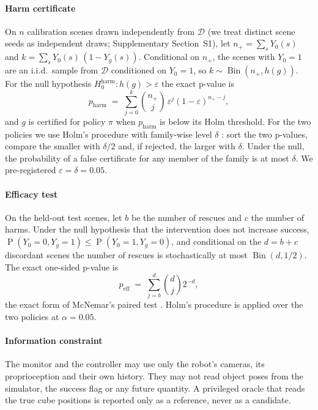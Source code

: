 \documentclass[preprint,12pt]{elsarticle}
\renewcommand{\Pr}{\operatorname{P}}
\newcommand{\Bin}{\operatorname{Bin}}
\begin{document}
\paragraph{Harm certificate} On $n$ calibration scenes drawn independently from $\mathcal{D}$ (we treat distinct scene seeds as independent draws; Supplementary Section~S1), let $n_+=\sum_s Y_0(s)$ and $k=\sum_s Y_0(s)\,(1-Y_g(s))$. Conditional on $n_+$, the scenes with $Y_0=1$ are an i.i.d.\ sample from $\mathcal{D}$ conditioned on $Y_0=1$, so $k\sim\Bin(n_+, h(g))$. For the null hypothesis $H_0^{\mathrm{harm}}: h(g)>\varepsilon$ the exact p-value is
\begin{equation}\label{eq:cert}
p_{\mathrm{harm}} \;=\; \sum_{j=0}^{k}\binom{n_+}{j}\,\varepsilon^{j}(1-\varepsilon)^{n_+-j},
\end{equation}
and $g$ is certified for policy $\pi$ when $p_{\mathrm{harm}}$ is below its Holm threshold. For the two policies we use Holm's procedure with family-wise level $\delta$ \cite{holm1979}: sort the two p-values, compare the smaller with $\delta/2$ and, if rejected, the larger with $\delta$. Under the null, the probability of a false certificate for any member of the family is at most $\delta$. We pre-registered $\varepsilon=\delta=0.05$.

\paragraph{Efficacy test} On the held-out test scenes, let $b$ be the number of rescues and $c$ the number of harms. Under the null hypothesis that the intervention does not increase success, $\Pr(Y_0=0,Y_g=1)\le\Pr(Y_0=1,Y_g=0)$, and conditional on the $d=b+c$ discordant scenes the number of rescues is stochastically at most $\Bin(d,1/2)$. The exact one-sided p-value is
\begin{equation}\label{eq:eff}
p_{\mathrm{eff}} \;=\; \sum_{j=b}^{d}\binom{d}{j}2^{-d},
\end{equation}
the exact form of McNemar's paired test \cite{mcnemar1947}. Holm's procedure is applied over the two policies at $\alpha=0.05$.

\paragraph{Information constraint} The monitor and the controller may use only the robot's cameras, its proprioception and their own history. They may not read object poses from the simulator, the success flag or any future quantity. A privileged oracle that reads the true cube positions is reported only as a reference, never as a candidate.
\end{document}
